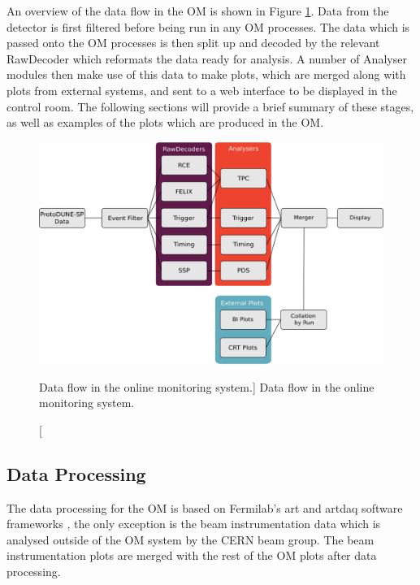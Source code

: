 An overview of the data flow in the OM is shown in Figure \ref{fig:om_flow}. 
Data from the detector is first filtered before being run in any OM processes. 
The data which is passed onto the OM processes is then split up and decoded by 
the relevant RawDecoder which reformats the data ready for analysis. A number 
of Analyser modules then make use of this data to make plots, which are merged 
along with plots from external systems, and sent to a web interface to be 
displayed in the control room. The following sections will provide a brief 
summary of these stages, as well as examples of the plots which are produced 
in the OM.

\begin{figure}

	\centering

	\includegraphics[width=\textwidth]{figures/om_flow.png}

	\caption
	[Data flow in the \protodune{} online monitoring system.]
	{Data flow in the \protodune{} online monitoring system.}

	\label{fig:om_flow}

\end{figure}

\subsection{Data Processing}
The data processing for the OM is based on Fermilab's art and artdaq software
frameworks \cite{TODO}, the only exception is the beam instrumentation data 
which is analysed outside of the OM system by the CERN beam group. The beam
instrumentation plots are merged with the rest of the OM plots after data
processing.

